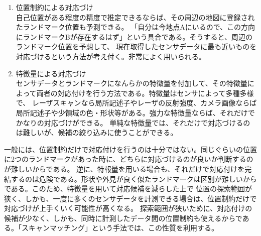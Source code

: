 \begin{enumerate}
  \item 位置制約による対応づけ\\
  自己位置がある程度の精度で推定できるならば、その周辺の地図に登録されたランドマーク位置も予測できる。
  「自分は今地点Aにいるので、この方向にランドマークBが存在するはず」という具合である。そうすると、周辺のランドマーク位置を予想して、
  現在取得したセンサデータに最も近いものを対応づけるという方法が考え付く。非常によく用いられる。
  \item 特徴量による対応づけ\\
  センサデータとランドマークになんらかの特徴量を付加して、その特徴量によって両者の対応付けを行う方法である。特徴量はセンサによって多種多様で、
  レーザスキャンなら局所記述子やレーザの反射強度、カメラ画像ならば局所記述子や少領域の色・形状等がある。強力な特徴量ならば、それだけでかなりの対応づけができる。
  単純な特徴量では、それだけで対応づけるのは難しいが、候補の絞り込みに使うことができる。
\end{enumerate}

一般には、位置制約だけで対応付けを行うのは十分ではない。同じぐらいの位置に2つのランドマークがあった時に、どちらに対応づけるのが良いか判断するのが難しいからである。
逆に、特報量を用いる場合も、それだけで対応付けを完結するのは危険である。形状や外見が良く似たランドマークは区別が難しいからである。このため、特徴量を用いて対応候補を減らした上で
位置の探索範囲が狭く、しかも、一度に多くのセンサデータを計測できる場合は、位置制約だけで対応づけが上手くいく可能性が高くなる。
探索範囲が狭いために、対応付けの候補が少なく、しかも、同時に計測したデータ間の位置制約も使えるからである。「スキャンマッチング」という手法では、この性質を利用する。

